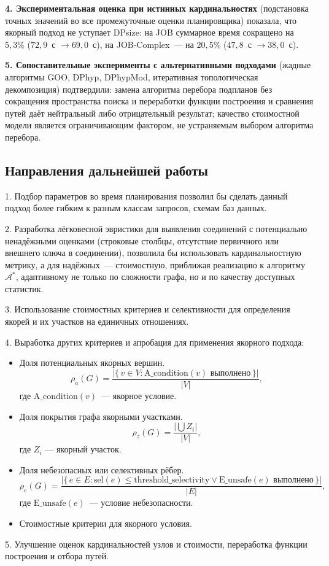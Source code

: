 \textbf{4. Экспериментальная оценка при истинных кардинальностях} 
(подстановка точных значений во все промежуточные оценки планировщика)
показала, что якорный подход не уступает DPsize:
на JOB суммарное время сокращено на $5{,}3\%$ ($72{,}9$~с $\to 69{,}0$~с),
на JOB-Complex~--- на $20{,}5\%$ ($47{,}8$~с $\to 38{,}0$~с).

\textbf{5. Сопоставительные эксперименты с альтернативными подходами}
(жадные алгоритмы GOO, DPhyp, DPhypMod, итеративная топологическая
декомпозиция) подтвердили: замена алгоритма перебора подпланов
без сокращения пространства поиска и переработки функции построения и сравнения путей даёт 
нейтральный либо отрицательный результат; качество стоимостной модели является ограничивающим фактором,
не устраняемым выбором алгоритма перебора.
\par

\subsection{Направления дальнейшей работы}

1. Подбор параметров во время планирования позволил бы сделать данный 
подход более гибким к разным классам запросов, схемам баз данных.
\par

2. Разработка лёгковесной эвристики для выявления соединений
с потенциально ненадёжными оценками
(строковые столбцы, отсутствие первичного или внешнего ключа в соединении),
позволила бы использовать кардинальностную метрику, а для 
надёжных~--- стоимостную,
приближая реализацию к алгоритму $\mathcal{A}^*$,
адаптивному не только по сложности графа,
но и по качеству доступных статистик.
\par

3. Использование стоимостных критериев и селективности для определения якорей и их участков 
на единичных отношениях.
\par


4. Выработка других критериев и апробация для применения якорного подхода:
\begin{itemize}
    \item Доля потенциальных якорных вершин. 
    \[
    \rho_a(G) = \frac{|\{\,v \in V : \text{A\_condition}(v) \text{ выполнено}\,\}|}{|V|},
    \] 
    где $\text{A\_condition}(v)$~--- якорное условие.

    \item Доля покрытия графа якорными участками. 
    \[
    \rho_z(G) = \frac{|\bigcup Z_i|}{|V|},
    \] 
    где $Z_i$ --- якорный участок.

    \item Доля небезопасных или селективных рёбер. 
    \[
    \rho_e(G) = \frac{|\{\,e \in E : \text{sel}(e) \leq \text{threshold\_selectivity} \lor \text{E\_unsafe}(e) \text{ выполнено}\,\}|}{|E|},
    \]
    где $\text{E\_unsafe}(e)$~--- условие небезопасности.

    \item Стоимостные критерии для якорного условия.
\end{itemize}

5. Улучшение оценок кардинальностей узлов и стоимости, переработка функции построения и отбора путей.